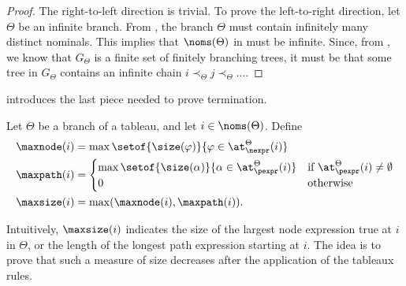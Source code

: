 \begin{proof}
  The right-to-left direction is trivial.
  To prove the left-to-right direction, let  $\Theta$ be an infinite branch.
  From , the branch $\Theta$ must contain infinitely many distinct nominals.
  This implies that $\noms(\Theta)$ in  must be infinite.
  Since, from , we know that $G_\Theta$ is a finite set of finitely branching trees, it must be that some tree in $G_\Theta$ contains an infinite chain $i \prec_\Theta j \prec_\Theta \dots $.
\end{proof}

 introduces the last piece needed to prove termination.

\begin{defi}\label{def:maxsize}
  Let $\Theta$ be a branch of a tableau, and let $i \in \noms(\Theta)$. Define
  \begin{align*}
    \maxnode(i) & = 
      \max\setof{ \size(\varphi)}{ \varphi \in \at^\Theta_{\nexpr}(i) } \\
    \maxpath(i) &=
      \begin{cases}
        \max\setof{\size(\alpha)}{\alpha \in \at^{\Theta}_{\pexpr}(i)} & \text{if } \at^{\Theta}_{\pexpr}(i) \neq \emptyset \\
        0 & \text{otherwise}\\
      \end{cases}\\
    \maxsize(i)
& = \max (\maxnode(i) , \maxpath(i)).
  \end{align*}
\end{defi}

Intuitively, $ \maxsize(i)$ indicates the size of the largest node expression true at $i$ in $\Theta$, or the length of the longest path expression starting at $i$.
The idea is to prove that such a measure of size decreases after the application of the tableaux rules. 

